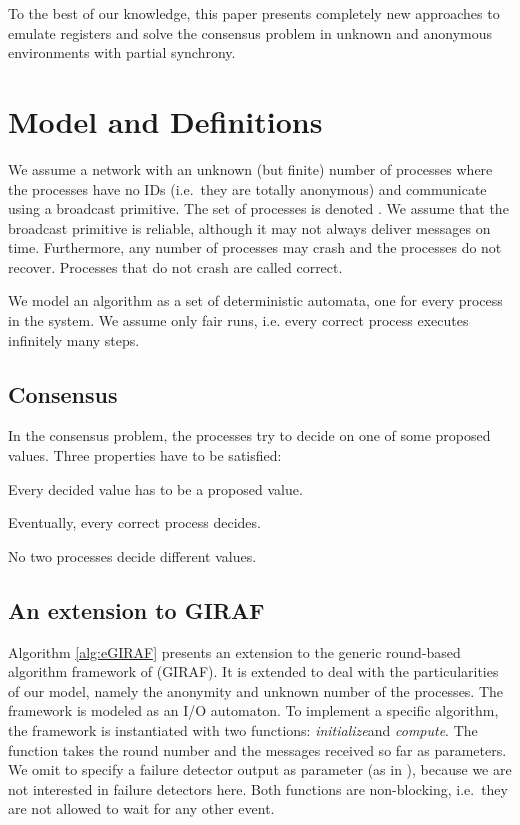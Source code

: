 \documentclass[conference, compsoc]{IEEEtran}
\def\initialize{\textit{initialize}}
\def\compute{\textit{compute}}
\begin{document}
To the best of our knowledge, this paper presents completely new approaches to emulate registers and solve the consensus problem in unknown and anonymous environments with partial synchrony.  



\section{Model and Definitions}

We assume a network with an unknown (but finite) number of processes where the processes have no IDs (i.e.~they are totally anonymous) and communicate using a broadcast primitive. The set of processes is denoted . We assume that the broadcast primitive is reliable, although it may not always deliver messages on time. Furthermore, any number of processes may crash and the processes do not recover. Processes that do not crash are called correct.

We model an algorithm  as a set of deterministic automata, one for every process in the system. We assume only fair runs, i.e. every correct process executes infinitely many steps.    

\subsection{Consensus}
 
In the consensus problem, the processes try to decide on one of some proposed values. Three properties have to be satisfied:
\begin{description} 
 \item[Validity:] Every decided value has to be a proposed value.
 \item[Termination:] Eventually, every correct process decides.
 \item[Agreement:] No two processes decide different values.
\end{description} 

 
\subsection{An extension to GIRAF}

Algorithm \ref{alg:eGIRAF} presents an extension to the generic round-based algorithm framework of \cite{1449454} (GIRAF). It is extended to deal with the particularities of our model, namely the anonymity and unknown number of the processes. The framework is modeled as an I/O automaton. To implement a specific algorithm, the framework is instantiated with two functions: \initialize and \compute. The  function takes the round number and the messages received so far as parameters. We omit to specify a failure detector output as parameter (as in \cite{1449454}), because we are not interested in failure detectors here. Both functions are non-blocking, i.e.~they are not allowed to wait for any 
other event. 
\end{document}
